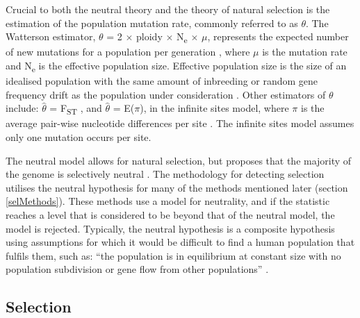 \documentclass[twoside,openright]{report}
\begin{document}
Crucial to both the neutral theory and the theory of natural selection
is the estimation of the population mutation rate, commonly referred to
as \(\theta\). The Watterson estimator, \(\theta\) = 2 \(\times\) ploidy
\(\times\) N\textsubscript{e} \(\times\) \(\mu\), represents the
expected number of new mutations for a population per generation
\citep{Watterson1975}, where \(\mu\) is the mutation rate and
N\textsubscript{e} is the effective population size. Effective
population size is the size of an idealised population with the same
amount of inbreeding or random gene frequency drift as the population
under consideration \citep{KimuraCrow1963}. Other estimators of
\(\theta\) include: \(\hat{\theta}\) = F\textsubscript{ST}
\citep{Weir1984}, and \(\hat{\theta}\) = E(\(\pi\)), in the infinite
sites model, where \(\pi\) is the average pair-wise nucleotide
differences per site \citep{Tajima1996a}. The infinite sites model
assumes only one mutation occurs per site.

The neutral model allows for natural selection, but proposes that the
majority of the genome is selectively neutral \citep{kimura1979neutral}.
The methodology for detecting selection utilises the neutral hypothesis
for many of the methods mentioned later (section \ref{selMethods}).
These methods use a model for neutrality, and if the statistic reaches a
level that is considered to be beyond that of the neutral model, the
model is rejected. Typically, the neutral hypothesis is a composite
hypothesis using assumptions for which it would be difficult to find a
human population that fulfils them, such as: ``the population is in
equilibrium at constant size with no population subdivision or gene flow
from other populations'' \citep{Nielsen2005a}.

\subsection{Selection}\label{selection}
\end{document}
